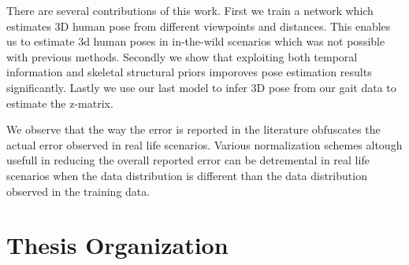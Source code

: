 There are several contributions of this work. First we train a network which estimates 3D human pose
from different viewpoints and distances. This enables us to estimate 3d human poses in in-the-wild 
scenarios which was not possible with previous methods. Secondly we show that exploiting both 
temporal information and skeletal structural priors imporoves pose estimation results significantly. 
Lastly we use our last model to infer 3D pose from our gait data to estimate the z-matrix.

We observe that the way the error is reported in the literature obfuscates the actual error observed in real life scenarios.
Various normalization schemes altough usefull in reducing the overall reported error can be detremental in real life scenarios 
when the data distribution is different than the data distribution observed in the training data.

\section{Thesis Organization}
